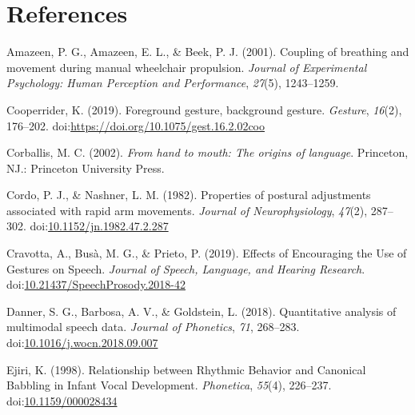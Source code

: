 \documentclass[
  man, noextraspace,floatsintext]{apa6}
\newlength{\cslhangindent}
\newenvironment{cslreferences}%
  {\setlength{\parindent}{0pt}%
  \everypar{\setlength{\hangindent}{\cslhangindent}}\ignorespaces}%
  {\par}
\begin{document}
\hypertarget{references}{%
\section{References}\label{references}}

\begingroup
\setlength{\parindent}{-0.5in}
\setlength{\leftskip}{0.5in}

\hypertarget{refs}{}
\begin{cslreferences}
\leavevmode\hypertarget{ref-amazeenCouplingBreathingMovement2001}{}%
Amazeen, P. G., Amazeen, E. L., \& Beek, P. J. (2001). Coupling of breathing and movement during manual wheelchair propulsion. \emph{Journal of Experimental Psychology: Human Perception and Performance}, \emph{27}(5), 1243--1259.

\leavevmode\hypertarget{ref-cooperriderForegroundGestureBackground2019}{}%
Cooperrider, K. (2019). Foreground gesture, background gesture. \emph{Gesture}, \emph{16}(2), 176--202. doi:\href{https://doi.org/https://doi.org/10.1075/gest.16.2.02coo}{https://doi.org/10.1075/gest.16.2.02coo}

\leavevmode\hypertarget{ref-corballisHandMouthOrigins2002}{}%
Corballis, M. C. (2002). \emph{From hand to mouth: The origins of language}. Princeton, NJ.: Princeton University Press.

\leavevmode\hypertarget{ref-cordoPropertiesPosturalAdjustments1982}{}%
Cordo, P. J., \& Nashner, L. M. (1982). Properties of postural adjustments associated with rapid arm movements. \emph{Journal of Neurophysiology}, \emph{47}(2), 287--302. doi:\href{https://doi.org/10.1152/jn.1982.47.2.287}{10.1152/jn.1982.47.2.287}

\leavevmode\hypertarget{ref-cravottaEffectsEncouragingUse2019}{}%
Cravotta, A., Busà, M. G., \& Prieto, P. (2019). Effects of Encouraging the Use of Gestures on Speech. \emph{Journal of Speech, Language, and Hearing Research}. doi:\href{https://doi.org/10.21437/SpeechProsody.2018-42}{10.21437/SpeechProsody.2018-42}

\leavevmode\hypertarget{ref-dannerQuantitativeAnalysisMultimodal2018}{}%
Danner, S. G., Barbosa, A. V., \& Goldstein, L. (2018). Quantitative analysis of multimodal speech data. \emph{Journal of Phonetics}, \emph{71}, 268--283. doi:\href{https://doi.org/10.1016/j.wocn.2018.09.007}{10.1016/j.wocn.2018.09.007}

\leavevmode\hypertarget{ref-ejiriRelationshipRhythmicBehavior1998}{}%
Ejiri, K. (1998). Relationship between Rhythmic Behavior and Canonical Babbling in Infant Vocal Development. \emph{Phonetica}, \emph{55}(4), 226--237. doi:\href{https://doi.org/10.1159/000028434}{10.1159/000028434}


\end{cslreferences}
\end{document}
